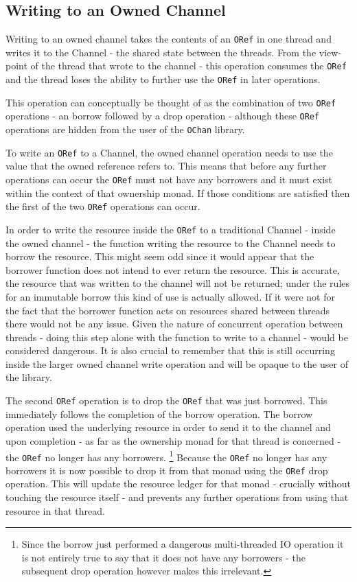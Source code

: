 \documentclass[onehalf,11pt]{beavtex}
\begin{document}
\subsection{Writing to an Owned Channel}

Writing to an owned channel takes the contents of an \texttt{ORef} in
one thread and writes it to the Channel - the shared state between the threads.
From the view-point of the thread that wrote to the channel - this operation
consumes the \texttt{ORef} and the thread loses the ability to further use the
\texttt{ORef} in later operations.

This operation can conceptually be thought of as the combination of two
\texttt{ORef} operations - an borrow followed by a drop operation -
although these \texttt{ORef} operations are hidden from the user of the
\texttt{OChan} library.

To write an \texttt{ORef} to a Channel, the owned channel operation
needs to use the value that the owned reference refers to.  This means
that before any further operations can occur the \texttt{ORef} must not have any
borrowers and it must exist within the context of that ownership monad.
If those conditions are satisfied then the first of the two \texttt{ORef}
operations can occur.

In order to write the resource inside the \texttt{ORef} to a traditional Channel
- inside the owned channel - the function writing the resource to the
Channel needs to borrow the resource.
This might seem odd since it would appear that the borrower function does not
intend to ever return the resource.  This is accurate, the resource that was
written to the channel will not be returned; under the rules for an immutable
borrow this kind of use is actually allowed.  If it were not for the fact that
the borrower function acts on resources shared between threads there would not be
any issue.  Given the nature of concurrent operation between threads - doing
this step alone with the function to write to a channel - would be considered
dangerous.  It is also crucial to remember that this is still occurring inside
the larger owned channel write operation and will be opaque to the user
of the library.

The second \texttt{ORef} operation is to drop the \texttt{ORef} that was just
borrowed. This immediately follows the completion of the borrow operation. The
borrow operation used the underlying resource in order to send it to the channel
and upon completion - as far as the ownership monad for that thread is
concerned - the \texttt{ORef} no longer has any borrowers.
\footnote{Since the borrow just performed a dangerous multi-threaded IO operation
  it is not entirely true to say that it does not have any borrowers - the
  subsequent drop operation however makes this irrelevant.}
Because the \texttt{ORef} no longer has any borrowers it is now possible to
drop it from that monad using the \texttt{ORef} drop operation.  This will
update the resource ledger for that monad - crucially without touching the
resource itself - and prevents any further operations from using that resource
in that thread.
\end{document}
